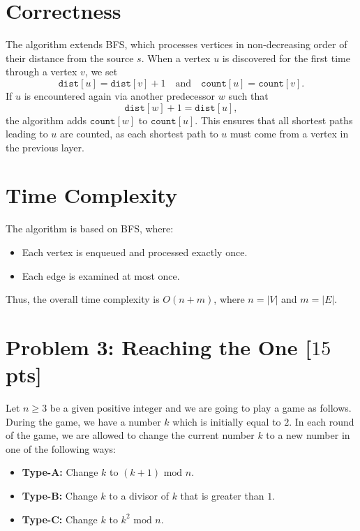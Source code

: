 \documentclass[letterpaper, 11pt]{article}
\newcommand{\1}{\mathds{1}}	%
\theoremstyle{definition}
\newcommand{\problem}[1]{\section*{Problem #1}}
\newenvironment{solution}{{\par\noindent\it Solution.}}{}
\begin{document}
\begin{solution}
\section*{Correctness}

The algorithm extends BFS, which processes vertices in non-decreasing order of their distance from the source \(s\). When a vertex \(u\) is discovered for the first time through a vertex \(v\), we set 
\[
\texttt{dist}[u] = \texttt{dist}[v] + 1 \quad \text{and} \quad \texttt{count}[u] = \texttt{count}[v].
\]
If \(u\) is encountered again via another predecessor \(w\) such that 
\[
\texttt{dist}[w] + 1 = \texttt{dist}[u],
\]
the algorithm adds \(\texttt{count}[w]\) to \(\texttt{count}[u]\). This ensures that all shortest paths leading to \(u\) are counted, as each shortest path to \(u\) must come from a vertex in the previous layer.

\section*{Time Complexity}

The algorithm is based on BFS, where:
\begin{itemize}
    \item Each vertex is enqueued and processed exactly once.
    \item Each edge is examined at most once.
\end{itemize}
Thus, the overall time complexity is \(O(n + m)\), where \(n = |V|\) and \(m = |E|\).
\end{solution}
\clearpage

\problem{3: Reaching the One [$15$ pts]}
Let $n \geq 3$ be a given positive integer and we are going to play a game as follows.
During the game, we have a number $k$ which is initially equal to $2$.
In each round of the game, we are allowed to change the current number $k$ to a new number in one of the following ways:
\begin{itemize}
    \item \textbf{Type-A:} Change $k$ to $(k+1) \text{ mod } n$.
    \item \textbf{Type-B:} Change $k$ to a divisor of $k$ that is greater than $1$.
    \item \textbf{Type-C:} Change $k$ to $k^2 \text{ mod } n$.
\end{itemize}
\end{document}
